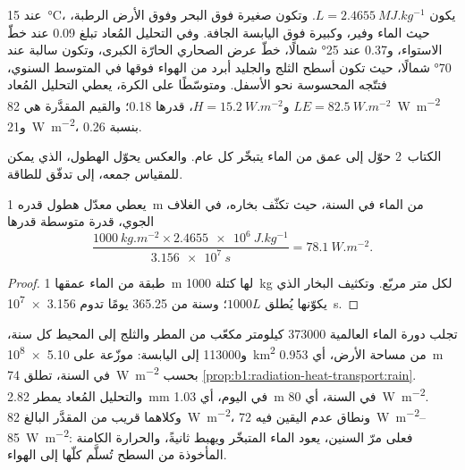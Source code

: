 عند \qty{15}{\celsius}، يكون $L = \qty{2.4655}{MJ.kg^{-1}}$. وتكون  صغيرة فوق البحر وفوق الأرض الرطبة، حيث الماء وفير، وكبيرة فوق اليابسة الجافة. وفي التحليل المُعاد تبلغ \num{0.09} عند خطّ الاستواء، و\num{0.37} عند \ang{25} شمالًا، خطّ عرض الصحاري الحارّة الكبرى، وتكون سالبة عند \ang{70} شمالًا، حيث تكون أسطح الثلج والجليد أبرد من الهواء فوقها في المتوسط السنوي، فتتّجه  المحسوسة نحو الأسفل. ومتوسّطًا على الكرة، يعطي التحليل المُعاد $LE =
\qty{82.5}{W.m^{-2}}$ و$H = \qty{15.2}{W.m^{-2}}$،  قدرها \num{0.18}؛ والقيم المقدَّرة هي \qty{82}{W.m^{-2}} و\qty{21}{W.m^{-2}}، بنسبة \num{0.26}.

الكتاب~2 حوّل  إلى عمق من الماء يتبخّر كل عام. والعكس يحوّل الهطول، الذي يمكن للمقياس جمعه، إلى تدفّق للطاقة.

\begin{proposition}\label{prop:b1:radiation-heat-transport:rain}
يعطي معدّل هطول قدره \qty{1}{m} من الماء في السنة، حيث تكثّف بخاره، في الغلاف الجوي، قدرة متوسطة قدرها
\[
  \frac{\qty{1000}{kg.m^{-2}} \times \qty{2.4655e6}{J.kg^{-1}}}{\qty{3.156e7}{s}}
  = \qty{78.1}{W.m^{-2}} .
\]
\end{proposition}

\begin{proof}
طبقة من الماء عمقها \qty{1}{m} لها كتلة \qty{1000}{kg} لكل متر مربّع. وتكثيف البخار الذي يكوّنها يُطلق $1000L$؛ وسنة من \num{365.25} يومًا تدوم \qty{3.156e7}{s}.
\end{proof}

\begin{example}\label{ex:b1:radiation-heat-transport:rain}
تجلب دورة الماء العالمية \num{373000} كيلومتر مكعّب من المطر والثلج إلى المحيط كل سنة، و\num{113000} إلى اليابسة: موزّعة على \qty{5.10e8}{km^2} من مساحة الأرض، أي \qty{0.953}{m} في السنة، تطلق \qty{74}{W.m^{-2}} بحسب \cref{prop:b1:radiation-heat-transport:rain}. والتحليل المُعاد يمطر \qty{2.82}{mm} في اليوم، أي \qty{1.03}{m} في السنة، أي \qty{80}{W.m^{-2}}. وكلاهما قريب من  المقدَّر البالغ \qty{82}{W.m^{-2}}، ونطاق عدم اليقين فيه \qtyrange{72}{85}{W.m^{-2}}: فعلى مرّ السنين، يعود الماء المتبخّر ويهبط ثانيةً، والحرارة الكامنة المأخوذة من السطح تُسلَّم كلّها إلى الهواء.
\end{example}

